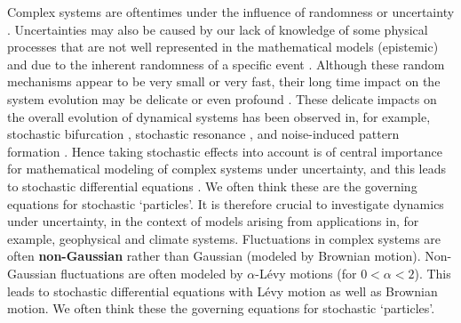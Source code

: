 \documentclass[11pt]{article}
\begin{document}
 
 Complex systems are oftentimes under the influence  of randomness or uncertainty \cite{Moss1, Horst, Gar, VanKampen3}. Uncertainties may also be caused by our lack of knowledge of some physical processes that are not well represented in the mathematical models (epistemic) and due to the inherent randomness of a specific event  \cite{Palmer1, Kantz, Wilks, Williams}.
Although these random mechanisms appear to be very small or very fast, their long time impact on the system evolution may be delicate or even profound \cite{Arnold, DuanBook2015}. These delicate impacts on the overall evolution of dynamical systems has been observed in, for example, stochastic bifurcation
\cite{Crauel, CarLanRob01, Horst}, stochastic resonance \cite{imkeller2002model},
 and  noise-induced pattern formation \cite{Gar, blomker2003pattern}.
Hence taking stochastic effects   into account is of
central importance for mathematical modeling of
complex systems under uncertainty, and this leads to stochastic   differential equations  \cite{Arnold, Ikeda, Okse2003, WaymireDuan}. We often think these are the governing equations for stochastic `particles'. It is therefore crucial to investigate dynamics under uncertainty, in the context of models arising from applications in, for example, geophysical and climate systems.
Fluctuations in complex systems are often
{\bf non-Gaussian} \cite{Woy,Dit,Swinney,Shlesinger,taqqu,dybiec2009levy} rather than Gaussian (modeled by Brownian motion). Non-Gaussian fluctuations are often modeled by $\alpha$-L\'evy motions (for $0<\alpha<2$). This leads to 
 stochastic   differential equations  \cite{Arnold, Ikeda, Okse2003, WaymireDuan}
 with L\'evy motion as well as Brownian motion. We often think these   the governing equations for stochastic `particles'.

\end{document}
